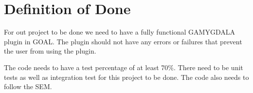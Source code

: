 \section{Definition of Done}
For out project to be done we need to have a fully functional \gls{GAMYGDALA} plugin in \gls{GOAL}. The plugin should not have any errors or failures that prevent the user from using the plugin. \\ \par
The code needs to have a test percentage of at least 70\%. There need to be unit tests as well as integration test for this project to be done. The code also needs to follow the \gls{SEM}.